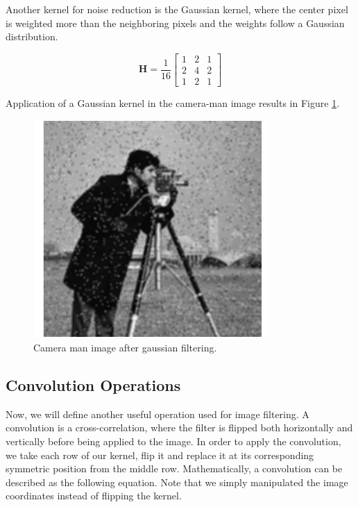 Another kernel for
noise reduction is the Gaussian kernel, where the center pixel
is weighted more than the neighboring pixels and the weights follow
a Gaussian distribution. 

\begin{equation}
\mathbf{H} = \frac{1}{16}\begin{bmatrix}
1 & 2 & 1 \\
2 & 4 & 2 \\
1 & 2 & 1 
\end{bmatrix}
\end{equation}


Application of a Gaussian kernel in the camera-man image results in Figure \ref{camera_man_4}.  

\begin{figure}[!htb]
\begin{center}
\includegraphics[scale=0.380]{img/visual_perception/camera_man_4.jpeg}
\end{center}
\caption{Camera man image after gaussian filtering.}
\label{camera_man_4}
\end{figure}

\subsection{Convolution Operations}

Now, we will define another useful operation
used for image filtering. A convolution is a cross-correlation, where the filter is
flipped both horizontally and vertically before being
applied to the image. In order to apply the convolution, we take each row of our kernel, flip it and replace it at its corresponding symmetric
position from the middle row. Mathematically, a convolution can be described as
the following equation. Note that we simply manipulated the image coordinates instead
of flipping the kernel. 

